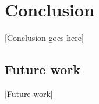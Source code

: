 \section{Conclusion}
\label{sec:conc}
[Conclusion goes here]

\subsection{Future work}
[Future work]
